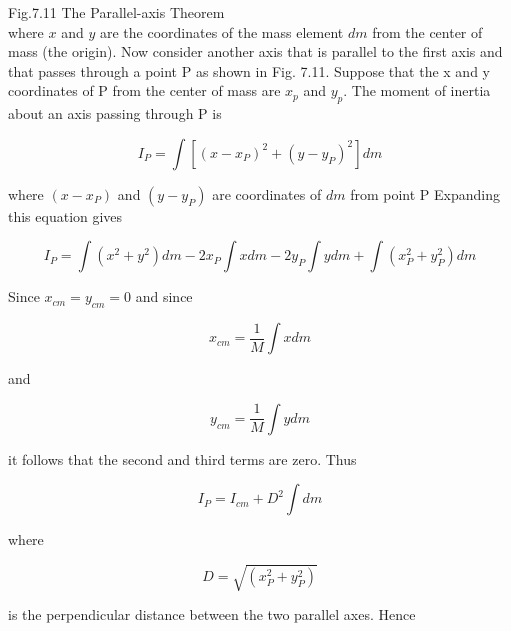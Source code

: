 \documentclass[10pt]{article}
\begin{document}
Fig.7.11 The Parallel-axis Theorem\\
where $x$ and $y$ are the coordinates of the mass element $d m$ from the center of mass (the origin). Now consider another axis that is parallel to the first axis and that passes through a point P as shown in Fig. 7.11. Suppose that the x and y coordinates of P from the center of mass are $x_{p}$ and $y_{p}$. The moment of inertia about an axis passing through P is

$$
I_{P}=\int\left[\left(x-x_{P}\right)^{2}+\left(y-y_{P}\right)^{2}\right] d m
$$

where $\left(x-x_{P}\right)$ and $\left(y-y_{P}\right)$ are coordinates of $d m$ from point P Expanding this equation gives

$$
I_{P}=\int\left(x^{2}+y^{2}\right) d m-2 x_{P} \int x d m-2 y_{P} \int y d m+\int\left(x_{P}^{2}+y_{P}^{2}\right) d m
$$

Since $x_{c m}=y_{c m}=0$ and since

$$
x_{c m}=\frac{1}{M} \int x d m
$$

and

$$
y_{c m}=\frac{1}{M} \int y d m
$$

it follows that the second and third terms are zero. Thus

$$
I_{P}=I_{c m}+D^{2} \int d m
$$

where

$$
D=\sqrt{\left(x_{P}^{2}+y_{P}^{2}\right)}
$$

is the perpendicular distance between the two parallel axes. Hence
\end{document}
